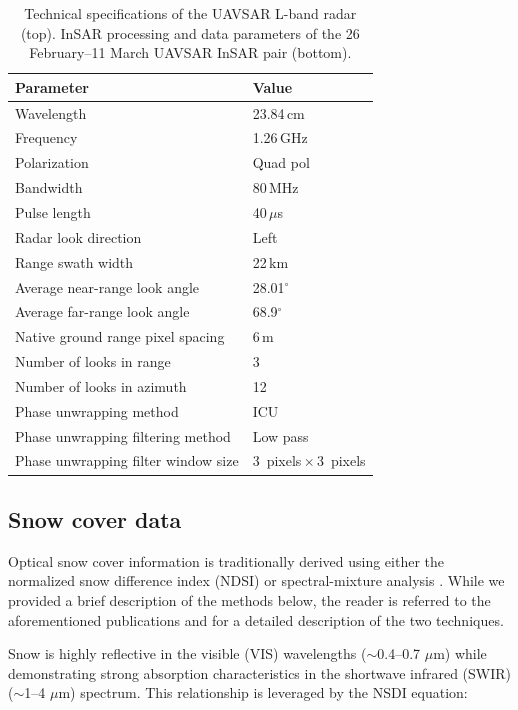 \begin{table}[t]
\centering
\caption{Technical specifications of the UAVSAR L-band radar (top). InSAR processing and data parameters of the 26 February--11 March UAVSAR InSAR pair (bottom).}
\begin{tabular}{ll}
\toprule Parameter & Value \\
\midrule
Wavelength & 23.84\,cm \\
Frequency & 1.26\,GHz \\
Polarization & Quad pol \\
Bandwidth & 80\,MHz \\
Pulse length & 40\,$\mu$s \\
Radar look direction & Left \\
Range swath width & 22\,km \\
Average near-range look angle & 28.01$^{\circ}$\\
Average far-range look angle & 68.9$^{\circ}$\\
\midrule
Native ground range pixel spacing & 6\,m \\
Number of looks in range & 3 \\
Number of looks in azimuth & 12 \\
Phase unwrapping method & ICU \\
Phase unwrapping filtering method & Low pass \\
Phase unwrapping filter window size & 3~pixels\,$\times$\,3~pixels \\
\bottomrule
\end{tabular}
\end{table}


\hypertarget{ch4-methods-2}{\subsection{Snow cover data}\label{ch4-methods-2}}

Optical snow cover information is traditionally derived using either the normalized snow difference index (NDSI) \citep{dozierSpectralSignatureAlpine1989} or spectral-mixture analysis \citep{rosenthalAutomatedMappingMontane1996,nolinMappingAlpineSnow1993}. While we provided a brief description of the methods below, the reader is referred to the aforementioned publications and \cite{stillingerLandsatMODISVIIRS2023} for a detailed description of the two techniques.

Snow is highly reflective in the visible (VIS) wavelengths ($\sim$0.4--0.7 $\mu$m) while demonstrating strong absorption characteristics in the shortwave infrared (SWIR) ($\sim$1--4 $\mu$m) spectrum. This relationship is leveraged by the NSDI equation:

